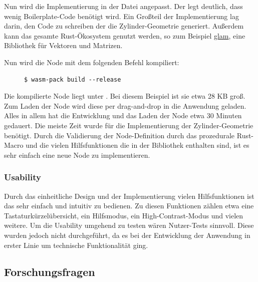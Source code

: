 \documentclass[ngerman]{article}
\begin{document}
Nun wird die Implementierung in der Datei  angepasst. Der  legt deutlich, dass wenig Boilerplate-Code benötigt wird. Ein Großteil der Implementierung lag darin, den Code zu schreiben der die Zylinder-Geometrie generiert.  Außerdem kann das gesamte Rust-Ökosystem genutzt werden, so zum Beispiel \href{https://docs.rs/glam/latest/glam}{glam}, eine Bibliothek für Vektoren und Matrizen.

\pagebreak

Nun wird die Node mit dem folgenden Befehl kompiliert:

\begin{figure}[htbp]
  \begin{code}
    \begin{verbatim}
$ wasm-pack build --release
    \end{verbatim}
  \end{code}
\end{figure}

Die kompilierte Node liegt unter . Bei diesem Beispiel ist sie etwa 28 KB groß. Zum Laden der Node wird diese per drag-and-drop in die Anwendung geladen. 
\br
Alles in allem hat die Entwicklung und das Laden der Node etwa 30 Minuten gedauert. Die meiste Zeit wurde für die Implementierung der Zylinder-Geometrie benötigt. 
Durch die Validierung der Node-Definition durch das prozedurale  Rust-Macro und die vielen Hilfsfunktionen die in der  Bibliothek enthalten sind, ist es sehr einfach eine neue Node zu implementieren.

\subsubsection{Usability}

Durch das einheitliche Design und der Implementierung vielen Hilfsfunktionen ist das  sehr einfach und intuitiv zu bedienen. Zu diesen Funktionen zählen etwa eine Tastaturkürzelübersicht, ein Hilfsmodus, ein High-Contrast-Modus und vielen weitere.
\br
Um die Usability umgehend zu testen wären Nutzer-Tests sinnvoll. Diese wurden jedoch nicht durchgeführt, da es bei der Entwicklung der Anwendung in erster Linie um technische Funktionalität ging.

\subsection{Forschungsfragen}
\end{document}
